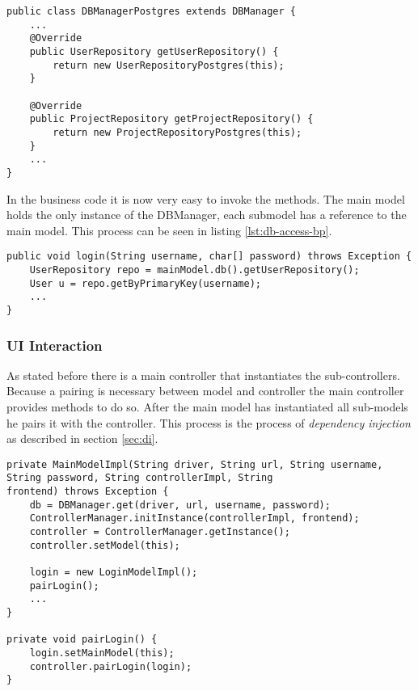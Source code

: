 \begin{lstlisting}[caption={Code snippet on how a DBManager implementation instantiates its repositories.}, captionpos=b]
public class DBManagerPostgres extends DBManager {
	...
	@Override
	public UserRepository getUserRepository() {
		return new UserRepositoryPostgres(this);
	}
	
	@Override
	public ProjectRepository getProjectRepository() {
		return new ProjectRepositoryPostgres(this);
	}
	...
}
\end{lstlisting}

In the business code it is now very easy to invoke the methods. The main model holds the only instance of the DBManager, each submodel has a reference to the main model. This process can be seen in listing \ref{lst:db-access-bp}.

\begin{lstlisting}[caption={Code snippet showing how repositories are used in business code. The main model holds the single instance of the DBManager. Each sub-model accesses it by using a getter-method.}, captionpos=b, label={lst:db-access-bp}]
public void login(String username, char[] password) throws Exception {
	UserRepository repo = mainModel.db().getUserRepository();
	User u = repo.getByPrimaryKey(username);
	...
}
\end{lstlisting}

\subsubsection{UI Interaction}
As stated before there is a main controller that instantiates the sub-controllers. Because a pairing is necessary between model and controller the main controller provides methods to do so. After the main model has instantiated all sub-models he pairs it with the controller. This process is the process of \emph{dependency injection} as described in section \ref{sec:di}.

\begin{lstlisting}[caption={Code snippet showing initialization code for the controller. The main model retrieves the main controller by calling a getter which is similarily implemented as the DBManager class shown in listing \ref{lst:dbmanager}. After that he calls a method that pairs the sub-model with the sub-controller, a code snippet showing this process can be seen in listing \ref{lst:pairing}.}, captionpos=b]
private MainModelImpl(String driver, String url, String username, String password, String controllerImpl, String
frontend) throws Exception {
	db = DBManager.get(driver, url, username, password);
	ControllerManager.initInstance(controllerImpl, frontend);
	controller = ControllerManager.getInstance();
	controller.setModel(this);
	
	login = new LoginModelImpl();
	pairLogin();
	...
}

private void pairLogin() {
	login.setMainModel(this);
	controller.pairLogin(login);
}

\end{lstlisting}

